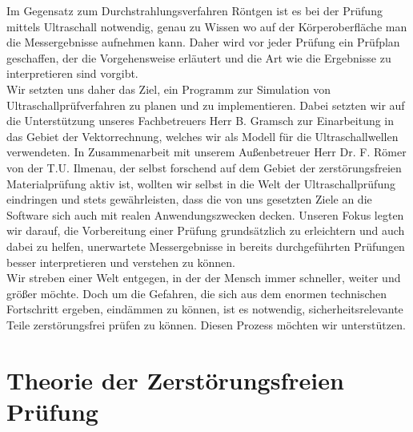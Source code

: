 \documentclass[reducespace,stylepage,semiarbeit]{spezidoc}
\begin{document}
Im Gegensatz zum Durchstrahlungsverfahren Röntgen ist es bei der Prüfung mittels Ultraschall notwendig, genau zu Wissen wo auf der Körperoberfläche man die Messergebnisse aufnehmen kann. Daher wird vor jeder Prüfung ein Prüfplan geschaffen, der die Vorgehensweise erläutert und die Art wie die Ergebnisse zu interpretieren sind vorgibt.\\
Wir setzten uns daher das Ziel, ein Programm zur Simulation von Ultraschallprüfverfahren zu planen und zu implementieren. Dabei setzten wir auf die Unterstützung unseres Fachbetreuers Herr B. Gramsch zur Einarbeitung in das Gebiet der Vektorrechnung, welches wir als Modell für die Ultraschallwellen verwendeten. In Zusammenarbeit mit unserem Außenbetreuer Herr Dr. F. Römer von der T.U. Ilmenau, der selbst forschend auf dem Gebiet der zerstörungsfreien Materialprüfung aktiv ist, wollten wir selbst in die Welt der Ultraschallprüfung eindringen und stets gewährleisten, dass die von uns gesetzten Ziele an die Software sich auch mit realen Anwendungszwecken decken.
Unseren Fokus legten wir darauf, die Vorbereitung einer Prüfung grundsätzlich zu erleichtern und auch dabei zu helfen, unerwartete Messergebnisse in bereits durchgeführten Prüfungen besser interpretieren und verstehen zu können.\\
Wir streben einer Welt entgegen, in der der Mensch immer schneller, weiter und größer möchte. Doch um die Gefahren, die sich aus dem enormen technischen Fortschritt ergeben, eindämmen zu können, ist es notwendig, sicherheitsrelevante Teile zerstörungsfrei prüfen zu können. Diesen Prozess möchten wir unterstützen.

\newpage

\section{Theorie der Zerstörungsfreien Prüfung}
\end{document}
